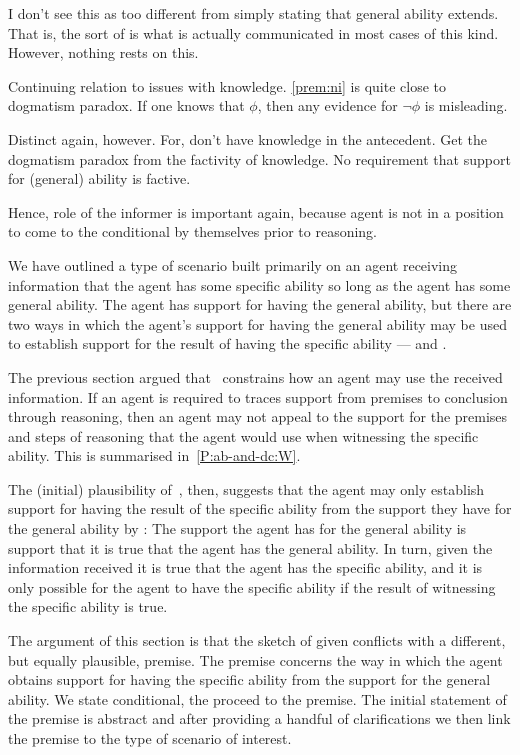 \begin{note}[Aside]
  I don't see this as too different from simply stating that general ability extends.
  That is, the sort of \gsi{} is what is actually communicated in most cases of this kind.
  However, nothing rests on this.
\end{note}

\begin{note}[Dogmatism]
  Continuing relation to issues with knowledge.
  \autoref{prem:ni} is quite close to dogmatism paradox.
  If one knows that \(\phi\), then any evidence for \(\lnot \phi\) is misleading.

  Distinct again, however.
  For, don't have knowledge in the antecedent.
  Get the dogmatism paradox from the factivity of knowledge.
  No requirement that support for (general) ability is factive.

  Hence, role of the informer is important again, because agent is not in a position to come to the conditional by themselves prior to reasoning.
\end{note}

\newpage

\begin{note}
  We have outlined a type of scenario built primarily on an agent receiving information that the agent has some specific ability so long as the agent has some general ability.
  The agent has support for having the general ability, but there are two ways in which the agent's support for having the general ability may be used to establish support for {\color{red} the result of having the specific ability} --- \AR{} and \WR{}.

  The previous section argued that~\uRa{} constrains how an agent may use the received information.
  If an agent is required to traces support from premises to conclusion through reasoning, then an agent may not appeal to the support for the premises and steps of reasoning that the agent would use when witnessing the specific ability.
  {\color{red} This is summarised in~\ref{P:ab-and-dc:W}.}

  The (initial) plausibility of~\uRa{}, then, suggests that the agent may only establish support for having the {\color{red} result of the specific ability} from the support they have for the general ability by \AR{}:
  The support the agent has for the general ability is support that it is true that the agent has the general ability.
  In turn, given the information received it is true that the agent has the specific ability, and it is only possible for the agent to have the specific ability if the result of witnessing the specific ability is true.

  The argument of this section is that the sketch of \AR{} given conflicts with a different, but equally plausible, premise.
  The premise concerns the way in which the agent obtains support for having the specific ability from the support for the general ability.
  We state conditional, the proceed to the premise.
  The initial statement of the premise is abstract and after providing a handful of clarifications we then link the premise to the type of scenario of interest.
\end{note}

